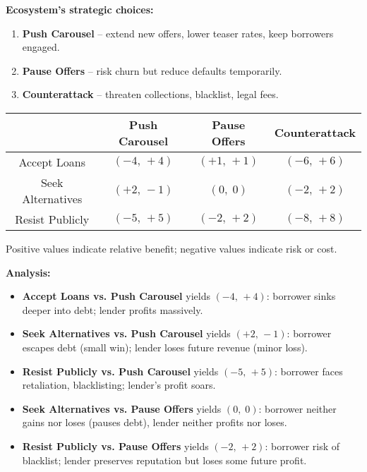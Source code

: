 \textbf{Ecosystem’s strategic choices:}
\begin{enumerate}
  \item \textbf{Push Carousel} – extend new offers, lower teaser rates, keep borrowers engaged.
  \item \textbf{Pause Offers} – risk churn but reduce defaults temporarily.
  \item \textbf{Counterattack} – threaten collections, blacklist, legal fees.
\end{enumerate}

\begin{center}
\begin{tabular}{|c|c|c|c|}
\hline
 & Push Carousel & Pause Offers & Counterattack \\
\hline
Accept Loans & $(-4,\,+4)$ & $(+1,\,+1)$ & $(-6,\,+6)$ \\
\hline
Seek Alternatives & $(+2,\,-1)$ & $(0,\;0)$ & $(-2,\,+2)$ \\
\hline
Resist Publicly & $(-5,\,+5)$ & $(-2,\,+2)$ & $(-8,\,+8)$ \\
\hline
\end{tabular}
\end{center}

\vspace{0.5em}
\noindent Positive values indicate relative benefit; negative values indicate risk or cost.

\medskip

\noindent\textbf{Analysis:}
\begin{itemize}
  \item  \textbf{Accept Loans vs. Push Carousel} yields $(-4,\,+4)$: borrower sinks deeper into debt; lender profits massively.
  \item  \textbf{Seek Alternatives vs. Push Carousel} yields $(+2,\,-1)$: borrower escapes debt (small win); lender loses future revenue (minor loss).
  \item  \textbf{Resist Publicly vs. Push Carousel} yields $(-5,\,+5)$: borrower faces retaliation, blacklisting; lender’s profit soars.
  \item  \textbf{Seek Alternatives vs. Pause Offers} yields $(0,\;0)$: borrower neither gains nor loses (pauses debt), lender neither profits nor loses.
  \item  \textbf{Resist Publicly vs. Pause Offers} yields $(-2,\,+2)$: borrower risk of blacklist; lender preserves reputation but loses some future profit.
\end{itemize}

